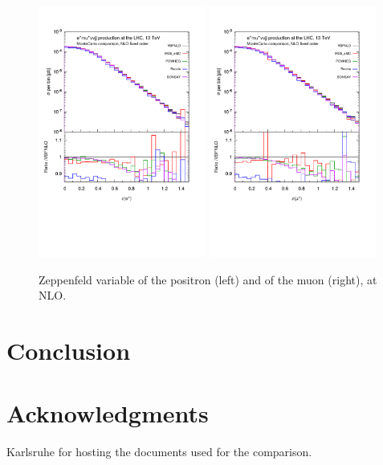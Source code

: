 \documentclass[a4paper,10pt]{report}
\begin{document}
\begin{figure}[h!]
   \centering
   \includegraphics[width=0.49\textwidth,angle=0,clip=true,trim={0.4cm 2.5cm 0.6cm 1.cm}]{figures/ze_NLO.pdf}
   \includegraphics[width=0.49\textwidth,angle=0,clip=true,trim={0.4cm 2.5cm 0.6cm 1.cm}]{figures/zmu_NLO.pdf}
\caption{\label{fig:zel-muNLO}Zeppenfeld variable of the positron (left) and of the muon (right), at NLO.
}
\end{figure}

\part{Conclusion}

\part{Acknowledgments}

Karlsruhe for hosting the documents used for the comparison.
\end{document}
